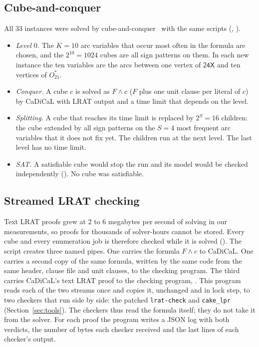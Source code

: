 \documentclass[11pt]{amsart}
\theoremstyle{definition}
\theoremstyle{remark}
\newcommand{\Ostar}{O_{21}^{*}}
\newcommand{\cl}[1]{\textsf{#1}}
\begin{document}
\subsection{Cube-and-conquer}\label{sec:cnc}
All $33$ instances were solved by cube-and-conquer~\cite{HKWB11} with the same
scripts (, ).
\begin{itemize}
\item \emph{Level $0$.} The $K=10$ arc variables that occur most often in the
  formula are chosen, and the $2^{10}=1024$ cubes are all sign patterns on
  them. In each new instance the ten variables are the arcs between one vertex
  of $\cl{24X}$ and ten vertices of $\Ostar$.
\item \emph{Conquer.} A cube $c$ is solved as $F \wedge c$ ($F$ plus one unit
  clause per literal of $c$) by CaDiCaL with LRAT output and a time limit that
  depends on the level.
\item \emph{Splitting.} A cube that reaches its time limit is replaced by
  $2^{S}=16$ children: the cube extended by all sign patterns on the $S=4$ most
  frequent arc variables that it does not fix yet. The children run at the
  next level. The last level has no time limit.
\item \emph{SAT.} A satisfiable cube would stop the run and its model would be
  checked independently (). No cube was
  satisfiable.
\end{itemize}

\subsection{Streamed LRAT checking}\label{sec:lrat}
Text LRAT proofs grew at $2$ to $6$ megabytes per second of solving in our
measurements, so proofs for thousands of solver-hours cannot be stored. Every
cube and every enumeration job is therefore checked while it is solved
(). The script creates three named pipes. One
carries the formula $F\wedge c$ to CaDiCaL. One carries a second copy of the
same formula, written by the same code from the same header, clause file and
unit clauses, to the checking program. The third carries CaDiCaL's text LRAT
proof to the checking program, . This
program reads each of the two streams once and copies it, unchanged and in
lock step, to two checkers that run side by side: the patched
\texttt{lrat-check} and \texttt{cake\_lpr} (Section~\ref{sec:tools}). The checkers thus read the formula itself; they do
not take it from the solver. For each proof the program writes a JSON log with
both verdicts, the number of bytes each checker received and the last lines
of each checker's output.
\end{document}
